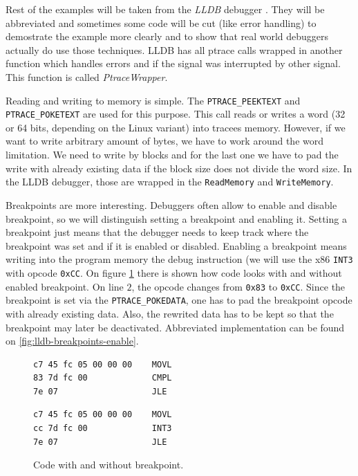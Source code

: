 Rest of the examples will be taken from the \textit{LLDB} debugger
. They
will be abbreviated and sometimes some code will be cut (like error handling)
to demostrate the example more clearly and to show that real world debuggers
actually do use those techniques. LLDB has all ptrace calls wrapped in another
function which handles errors and if the signal was interrupted by other
signal. This function is called \textit{PtraceWrapper}.

Reading and writing to memory is simple. The \texttt{PTRACE\_PEEKTEXT} and
\texttt{PTRACE\_POKETEXT} are used for this purpose. This call reads or writes
a word (32 or 64 bits, depending on the Linux variant) into tracees memory.
However, if we want to write arbitrary amount of bytes, we have to work around
the word limitation. We need to write by blocks and for the last one we have to
pad the write with already existing data if the block size does not divide the
word size. In the LLDB debugger, those are wrapped in the \texttt{ReadMemory}
and \texttt{WriteMemory}.

Breakpoints are more interesting. Debuggers often allow to enable and disable
breakpoint, so we will distinguish setting a breakpoint and enabling it.
Setting a breakpoint just means that the debugger needs to keep track where the
breakpoint was set and if it is enabled or disabled. Enabling a breakpoint
means writing into the program memory the debug instruction (we will use the
x86 \texttt{INT3} with opcode \texttt{0xCC}. On figure
\ref{fig:with-and-without-bp} there is shown how code looks with and without
enabled breakpoint. On line $2$, the opcode changes from \texttt{0x83} to
\texttt{0xCC}. Since the breakpoint is set via the \texttt{PTRACE\_POKEDATA},
one has to pad the breakpoint opcode with already existing data. Also, the
rewrited data has to be kept so that the breakpoint may later be deactivated.
Abbreviated implementation can be found on \ref{fig:lldb-breakpoints-enable}.

\begin{figure}\label{fig:with-and-without-bp}
    \begin{minipage}{0.45\textwidth}
        \begin{lstlisting}
c7 45 fc 05 00 00 00 	MOVL
83 7d fc 00          	CMPL
7e 07                	JLE
        \end{lstlisting}
    \end{minipage}
    \begin{minipage}{0.45\textwidth}
        \begin{lstlisting}
c7 45 fc 05 00 00 00 	MOVL
cc 7d fc 00          	INT3
7e 07                	JLE
        \end{lstlisting}
    \end{minipage}
    \caption{Code with and without breakpoint.}
\end{figure}

